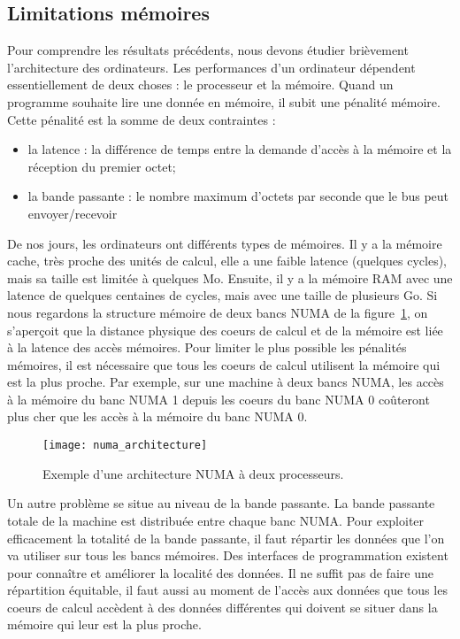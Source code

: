 \subsection{Limitations mémoires}
Pour comprendre les résultats précédents, nous devons étudier brièvement l'architecture des ordinateurs.
%
Les performances d'un ordinateur dépendent essentiellement de deux choses : le processeur et la mémoire.
%
Quand un programme souhaite lire une donnée en mémoire, il subit une pénalité mémoire.
%
Cette pénalité est la somme de deux contraintes :
\begin{itemize}
        \item la latence : la différence de temps entre la demande d'accès à la mémoire et la réception du premier octet;
        \item la bande passante : le nombre maximum d'octets par seconde que le bus peut envoyer/recevoir
\end{itemize}
%
De nos jours, les ordinateurs ont différents types de mémoires.
%
Il y a la mémoire cache, très proche des unités de calcul, elle a une faible latence (quelques cycles), mais sa taille est limitée à quelques Mo.
%
Ensuite, il y a la mémoire RAM avec une latence de quelques centaines de cycles, mais avec une taille de plusieurs Go.
%
Si nous regardons la structure mémoire de deux bancs NUMA de la figure~\ref{fig:numa_architecture}, on s'aperçoit que la distance physique des coeurs de calcul et de la mémoire est liée à la latence des accès mémoires.
%
Pour limiter le plus possible les pénalités mémoires, il est nécessaire que tous les coeurs de calcul utilisent la mémoire qui est la plus proche.
%
Par exemple, sur une machine à deux bancs NUMA, les accès à la mémoire du banc NUMA 1 depuis les coeurs du banc NUMA 0 coûteront plus cher que les accès à la mémoire du banc NUMA 0.
\begin{figure}
  \centering
  \texttt{[image: numa\_architecture]}
  \caption{Exemple d'une architecture NUMA à deux processeurs.}
  \label{fig:numa_architecture}
\end{figure}
Un autre problème se situe au niveau de la bande passante.
%
La bande passante totale de la machine est distribuée entre chaque banc NUMA.
%
Pour exploiter efficacement la totalité de la bande passante, il faut répartir les données que l'on va utiliser sur tous les bancs mémoires.
%
Des interfaces de programmation existent pour connaître et améliorer la localité des données.
%
Il ne suffit pas de faire une répartition équitable, il faut aussi au moment de l'accès aux données que tous les coeurs de calcul accèdent à des données différentes qui doivent se situer dans la mémoire qui leur est la plus proche.
